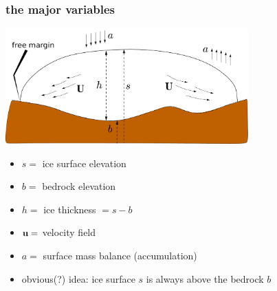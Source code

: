 \documentclass[10pt,hyperref={pdfpagelabels=true}]{beamer}
\begin{document}
\begin{frame}
  \frametitle{the major variables}

\begin{center}
\includegraphics[width=0.7\textwidth]{groundedscheme}
\end{center}

\begin{itemize}
\small
\item $s=$ ice surface elevation
\item $b=$ bedrock elevation
\item $h=$ ice thickness $ = s-b$
\item ${\bf u}=$ velocity field
\item $a=$ surface mass balance (accumulation)

\bigskip
\item obvious(?) idea: ice surface $s$ is always above the bedrock $b$
\end{itemize}

\end{frame}
\end{document}
